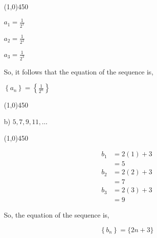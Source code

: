 \documentclass{report}
\begin{document}
\line(1,0){450}

\begin{center}
	$a_1 = \frac{1}{2^1}$
	\vspace{2mm}

	$a_{2} = \frac{1}{2^2}$
	\vspace{2mm}

	$a_{3} = \frac{1}{2^3}$
	\vspace{2mm}
\end{center}
\vspace{4mm}

So, it follows that the equation of the sequence is,
\vspace{4mm}
\begin{center}
  $\left\{a_n\right\}=\left\{\frac{1}{2^n}\right\}$
\end{center}
\bigbreak \noindent \bigbreak \noindent

\line(1,0){450}

\begin{center}
\begin{large}
	{\LARGE{b)}} $5,7,9,11, \ldots$
\end{large}
\end{center}

\line(1,0){450}

\begin{align*} b_1 & =2(1)+3 \\ & =5 \\ b_2 & =2(2)+3 \\ & =7 \\ b_3 & =2(3)+3 \\ & =9 \end{align*}
\vspace{4mm}

So, the equation of the sequence is,

$$\boxed{\left\{b_n\right\}=\{2 n+3\}}$$
\bigbreak \noindent \bigbreak \noindent
\end{document}
